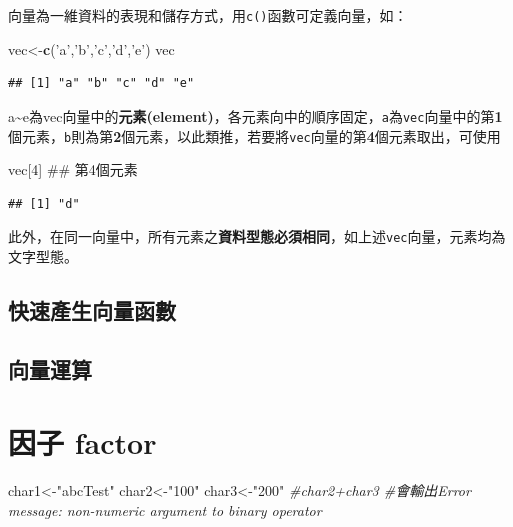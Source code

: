 \documentclass[]{book}
\newenvironment{Shaded}{\begin{snugshade}}{\end{snugshade}}
\newcommand{\KeywordTok}[1]{\textcolor[rgb]{0.13,0.29,0.53}{\textbf{{#1}}}}
\newcommand{\DecValTok}[1]{\textcolor[rgb]{0.00,0.00,0.81}{{#1}}}
\newcommand{\StringTok}[1]{\textcolor[rgb]{0.31,0.60,0.02}{{#1}}}
\newcommand{\CommentTok}[1]{\textcolor[rgb]{0.56,0.35,0.01}{\textit{{#1}}}}
\newcommand{\NormalTok}[1]{{#1}}
\theoremstyle{definition}
\theoremstyle{definition}
\theoremstyle{remark}
\begin{document}
向量為一維資料的表現和儲存方式，用\texttt{c()}函數可定義向量，如：

\begin{Shaded}
\begin{Highlighting}[]
\NormalTok{vec<-}\KeywordTok{c}\NormalTok{(}\StringTok{'a'}\NormalTok{,}\StringTok{'b'}\NormalTok{,}\StringTok{'c'}\NormalTok{,}\StringTok{'d'}\NormalTok{,}\StringTok{'e'}\NormalTok{)}
\NormalTok{vec}
\end{Highlighting}
\end{Shaded}

\begin{verbatim}
## [1] "a" "b" "c" "d" "e"
\end{verbatim}

a\textasciitilde{}e為vec向量中的\textbf{元素(element)}，各元素向中的順序固定，\texttt{a}為\texttt{vec}向量中的第\textbf{1}個元素，\texttt{b}則為第\textbf{2}個元素，以此類推，若要將\texttt{vec}向量的第\textbf{4}個元素取出，可使用

\begin{Shaded}
\begin{Highlighting}[]
\NormalTok{vec[}\DecValTok{4}\NormalTok{] ## 第4個元素}
\end{Highlighting}
\end{Shaded}

\begin{verbatim}
## [1] "d"
\end{verbatim}

此外，在同一向量中，所有元素之\textbf{資料型態必須相同}，如上述\texttt{vec}向量，元素均為文字型態。

\subsection{快速產生向量函數}

\subsection{向量運算}

\section{因子 factor}\label{-factor}

\begin{Shaded}
\begin{Highlighting}[]
\NormalTok{char1<-}\StringTok{"abcTest"} 
\NormalTok{char2<-}\StringTok{"100"}
\NormalTok{char3<-}\StringTok{"200"}
\CommentTok{#char2+char3 #會輸出Error message: non-numeric argument to binary operator}
\end{Highlighting}
\end{Shaded}
\end{document}
